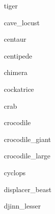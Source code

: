 \documentclass[letterpaper,serif]{module}
\begin{document}
\begin{newmonster}{tiger}\end{newmonster}

\begin{newmonster}{cave_locust}\end{newmonster}

\begin{newmonster}{centaur}\end{newmonster}

\begin{newmonster}{centipede}\end{newmonster}

\begin{newmonster}{chimera}\end{newmonster}

\begin{newmonster}{cockatrice}\end{newmonster}

\begin{newmonster}{crab}\end{newmonster}

\begin{newmonster}{crocodile}\end{newmonster}

\begin{newmonster}{crocodile_giant}\end{newmonster}

\begin{newmonster}{crocodile_large}\end{newmonster}

\begin{newmonster}{cyclops}\end{newmonster}

\begin{newmonster}{displacer_beast}\end{newmonster}

\begin{newmonster}{djinn_lesser}\end{newmonster}
\end{document}
